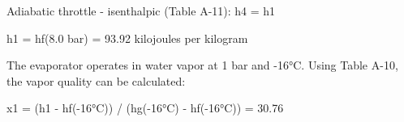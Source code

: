 Adiabatic throttle - isenthalpic (Table A-11):  
h4 = h1  

h1 = hf(8.0 bar) = 93.92 kilojoules per kilogram  

The evaporator operates in water vapor at 1 bar and -16°C. Using Table A-10, the vapor quality can be calculated:  

x1 = (h1 - hf(-16°C)) / (hg(-16°C) - hf(-16°C))  
= 30.76%
